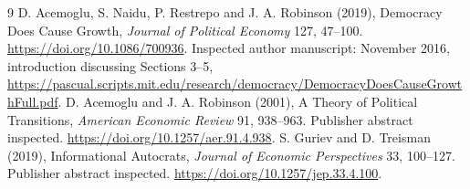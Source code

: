 \documentclass[11pt]{article}
\begin{document}
\begin{thebibliography}{9}
 D. Acemoglu, S. Naidu, P. Restrepo and J. A. Robinson (2019),
Democracy Does Cause Growth, \emph{Journal of Political Economy} 127,
47--100. \url{https://doi.org/10.1086/700936}.
Inspected author manuscript: November 2016, introduction discussing Sections
3--5, \url{https://pascual.scripts.mit.edu/research/democracy/DemocracyDoesCauseGrowthFull.pdf}.
 D. Acemoglu and J. A. Robinson (2001), A Theory of Political
Transitions, \emph{American Economic Review} 91, 938--963. Publisher
abstract inspected. \url{https://doi.org/10.1257/aer.91.4.938}.
 S. Guriev and D. Treisman (2019), Informational Autocrats,
\emph{Journal of Economic Perspectives} 33, 100--127. Publisher abstract
inspected. \url{https://doi.org/10.1257/jep.33.4.100}.
\end{thebibliography}
\end{document}
